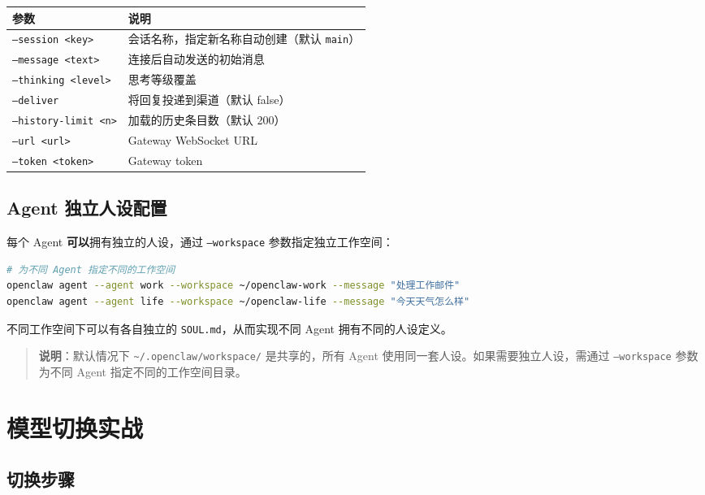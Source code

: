 \begin{table}[h]
\centering
\small
\begin{tabular}{|l|l|}
\hline
参数 & 说明 \\
\hline
\texttt{--session <key>} & 会话名称，指定新名称自动创建（默认 \texttt{main}） \\
\hline
\texttt{--message <text>} & 连接后自动发送的初始消息 \\
\hline
\texttt{--thinking <level>} & 思考等级覆盖 \\
\hline
\texttt{--deliver} & 将回复投递到渠道（默认 false） \\
\hline
\texttt{--history-limit <n>} & 加载的历史条目数（默认 200） \\
\hline
\texttt{--url <url>} & Gateway WebSocket URL \\
\hline
\texttt{--token <token>} & Gateway token \\
\hline
\end{tabular}
\end{table}

\subsection{Agent 独立人设配置}


每个 Agent \textbf{可以}拥有独立的人设，通过 \texttt{--workspace} 参数指定独立工作空间：

\begin{lstlisting}[language=bash]
# 为不同 Agent 指定不同的工作空间
openclaw agent --agent work --workspace ~/openclaw-work --message "处理工作邮件"
openclaw agent --agent life --workspace ~/openclaw-life --message "今天天气怎么样"
\end{lstlisting}

不同工作空间下可以有各自独立的 \texttt{SOUL.md}，从而实现不同 Agent 拥有不同的人设定义。

\begin{quote}
\textbf{说明}：默认情况下 \texttt{\textasciitilde{}/.openclaw/workspace/} 是共享的，所有 Agent 使用同一套人设。如果需要独立人设，需通过 \texttt{--workspace} 参数为不同 Agent 指定不同的工作空间目录。
\end{quote}

\hrulefill

\section{模型切换实战}


\subsection{切换步骤}


